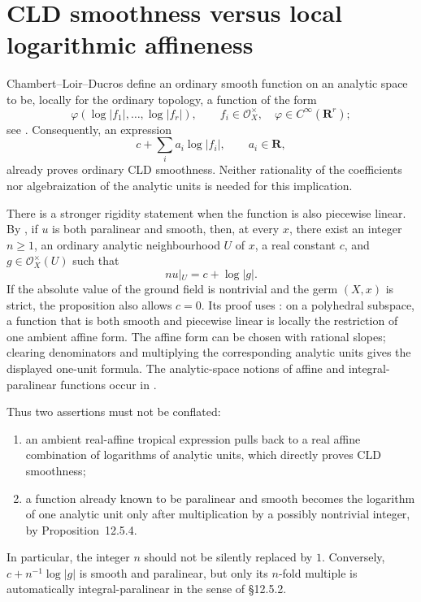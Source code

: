 
\section*{CLD smoothness versus local logarithmic affineness}

Chambert--Loir--Ducros define an ordinary smooth function on an analytic
space to be, locally for the ordinary topology, a function of the form
\[
  \varphi(\log|f_1|,\ldots,\log|f_r|),
  \qquad f_i\in\mathcal O_X^\times,
  \quad \varphi\in C^\infty(\mathbf R^r);
\]
see \cite[\S0.2.2]{CLD25}.  Consequently, an expression
\[
  c+\sum_i a_i\log|f_i|,\qquad a_i\in\mathbf R,
\]
already proves ordinary CLD smoothness.  Neither rationality of the
coefficients nor algebraization of the analytic units is needed for this
implication.

There is a stronger rigidity statement when the function is also
piecewise linear.  By \cite[Proposition~12.5.4]{CLD25}, if \(u\) is both
paralinear and smooth, then, at every \(x\), there exist an integer
\(n\geq1\), an ordinary analytic neighbourhood \(U\) of \(x\), a real
constant \(c\), and \(g\in\mathcal O_X^\times(U)\) such that
\[
                 n u|_U=c+\log|g|.
\]
If the absolute value of the ground field is nontrivial and the germ
\((X,x)\) is strict, the proposition also allows \(c=0\).  Its proof uses
\cite[Proposition~1.9.16]{CLD25}: on a polyhedral subspace, a function that
is both smooth and piecewise linear is locally the restriction of one
ambient affine form.  The affine form can be chosen with rational slopes;
clearing denominators and multiplying the corresponding analytic units
gives the displayed one-unit formula.  The analytic-space notions of
affine and integral-paralinear functions occur in
\cite[\S12.4.6 and \S12.5.2]{CLD25}.

Thus two assertions must not be conflated:
\begin{enumerate}
\item an ambient real-affine tropical expression pulls back to a real
  affine combination of logarithms of analytic units, which directly
  proves CLD smoothness;
\item a function already known to be paralinear and smooth becomes the
  logarithm of one analytic unit only after multiplication by a possibly
  nontrivial integer, by Proposition~12.5.4.
\end{enumerate}
In particular, the integer \(n\) should not be silently replaced by \(1\).
Conversely, \(c+n^{-1}\log|g|\) is smooth and paralinear, but only its
\(n\)-fold multiple is automatically integral-paralinear in the sense of
\S12.5.2.

